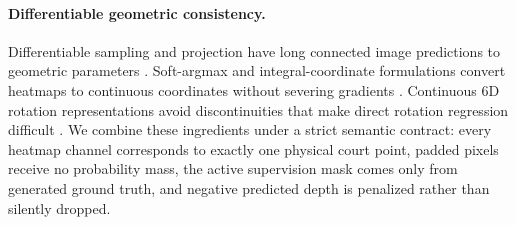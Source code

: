 \paragraph{Differentiable geometric consistency.}
Differentiable sampling and projection have long connected image predictions
to geometric parameters \citep{jaderberg2015spatial}.  Soft-argmax and
integral-coordinate formulations convert heatmaps to continuous coordinates
without severing gradients \citep{luvizon2019human}.  Continuous 6D rotation
representations avoid discontinuities that make direct rotation regression
difficult \citep{zhou2019continuity}.  We combine these ingredients under a
strict semantic contract: every heatmap channel corresponds to exactly one
physical court point, padded pixels receive no probability mass, the active
supervision mask comes only from generated ground truth, and negative predicted
depth is penalized rather than silently dropped.
